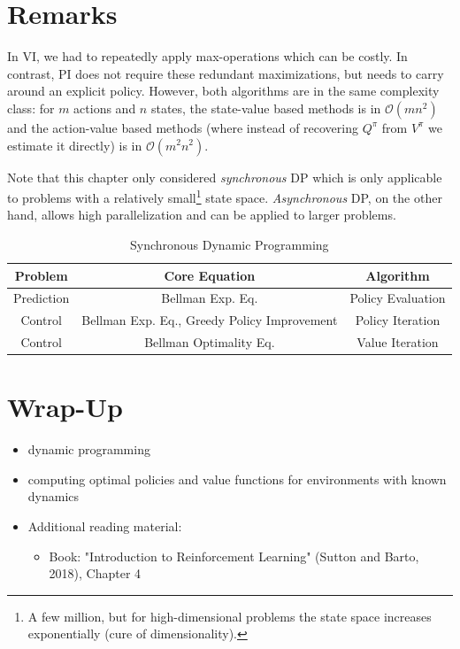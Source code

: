 	\section{Remarks}
		In \ac{VI}, we had to repeatedly apply max-operations which can be costly. In contrast, \ac{PI} does not require these redundant maximizations, but needs to carry around an explicit policy. However, both algorithms are in the same complexity class: for \(m\) actions and \(n\) states, the state-value based methods is in \( \mathcal{O}(m n^2) \) and the action-value based methods (where instead of recovering \(Q^\pi\) from \(V^\pi\) we estimate it directly) is in \( \mathcal{O}(m^2 n^2) \).

		Note that this chapter only considered \emph{synchronous} \ac{DP} which is only applicable to problems with a relatively small\footnote{A few million, but for high-dimensional problems the state space increases exponentially (cure of dimensionality).} state space. \emph{Asynchronous} \ac{DP}, on the other hand, allows high parallelization and can be applied to larger problems.

		\begin{table}
			\centering
			\begin{tabular}{ccc}
				\toprule
				\textbf{Problem} &           \textbf{Core Equation}            & \textbf{Algorithm} \\ \midrule
				   Prediction    &              Bellman Exp. Eq.               & Policy Evaluation  \\
				    Control      & Bellman Exp. Eq., Greedy Policy Improvement &  Policy Iteration  \\
				    Control      &           Bellman Optimality Eq.            &  Value Iteration   \\ \bottomrule
			\end{tabular}
			\caption{Synchronous Dynamic Programming}
			\label{fig:syncDp}
		\end{table}

	\section{Wrap-Up}
		\begin{itemize}
			\item dynamic programming
			\item computing optimal policies and value functions for environments with known dynamics
			\item Additional reading material:
				\begin{itemize}
					\item Book: "Introduction to Reinforcement Learning" (Sutton and Barto, 2018), Chapter 4
				\end{itemize}
		\end{itemize}

